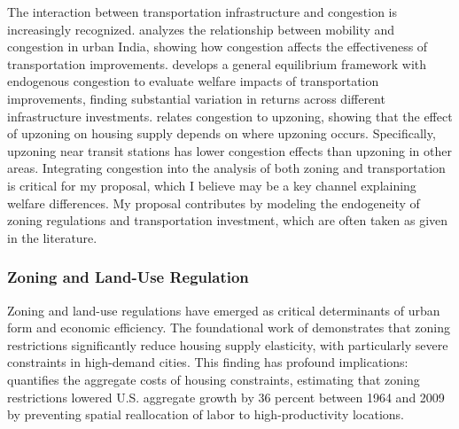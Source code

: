 \documentclass[12pt, a4paper]{article}
\begin{document}
The interaction between transportation infrastructure and congestion is increasingly recognized. \citet{Akbar2023-ce} analyzes the relationship between mobility and congestion in urban India, showing how congestion affects the effectiveness of transportation improvements. \citet{Allen2022-ms} develops a general equilibrium framework with endogenous congestion to evaluate welfare impacts of transportation improvements, finding substantial variation in returns across different infrastructure investments. \citet{Kashner2025-iv} relates congestion to upzoning, showing that the effect of upzoning on housing supply depends on where upzoning occurs. Specifically, upzoning near transit stations has lower congestion effects than upzoning in other areas. Integrating congestion into the analysis of both zoning and transportation is critical for my proposal, which I believe may be a key channel explaining welfare differences. My proposal contributes by modeling the endogeneity of zoning regulations and transportation investment, which are often taken as given in the literature.
\subsubsection{Zoning and Land-Use Regulation}

Zoning and land-use regulations have emerged as critical determinants of urban form and economic efficiency. The foundational work of \citet{Glaeser2002-vq} demonstrates that zoning restrictions significantly reduce housing supply elasticity, with particularly severe constraints in high-demand cities. This finding has profound implications: \citet{Hsieh2019-rx} quantifies the aggregate costs of housing constraints, estimating that zoning restrictions lowered U.S. aggregate growth by 36 percent between 1964 and 2009 by preventing spatial reallocation of labor to high-productivity locations.
\end{document}
